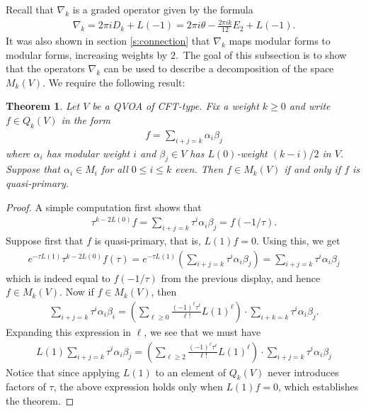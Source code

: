 \documentclass[12pt]{amsart}
\theoremstyle{plain}
\newtheorem{thm}{Theorem}[section]
\theoremstyle{definition}
\theoremstyle{remark}
\begin{document}
Recall that $\nabla_{k}$ is a graded operator given by the formula
\begin{align*}
    \nabla_{k} = 2\pi i D_{k} + L(-1) = 2\pi i \theta - \tfrac{2\pi i k}{12}E_{2} + L(-1).
\end{align*}
It was also shown in section \ref{s:connection} that $\nabla_{k}$ maps modular forms to modular forms, increasing weights by $2$.\ The goal of this subsection is to show that the operators $\nabla_k$ can be used to describe a decomposition of the space $M_{k}(V)$. We require the following result:
\begin{thm}
\label{t:quasiE2}
Let $V$ be a QVOA of CFT-type. Fix a weight $k \geq 0$ and write $f \in Q_{k}(V)$ in the form
\begin{align*}
            f = \sum_{i+j=k} \alpha_{i} \beta_{j}
        \end{align*}
        where $\alpha_{i}$ has modular weight $i$ and $\beta_{j} \in V$ has $L(0)$-weight $(k-i)/2$ in $V$.
    Suppose that $\alpha_{i} \in M_{i}$ for all $0 \leq i \leq k$ even. Then $f \in M_{k}(V)$ if and only if $f$ is quasi-primary.
    \end{thm}
\begin{proof}
        A simple computation first shows that
        \begin{align*}
            \tau^{k-2L(0)} f = \sum_{i+j=k} \tau^{i} \alpha_{i} \beta_{j} = f(-1/ \tau).
        \end{align*}
        Suppose first that $f$ is quasi-primary, that is, $L(1)f = 0$. Using this, we get
        \begin{align*}
            e^{-\tau L(1)} \tau^{k-2L(0)} f( \tau ) = e^{- \tau L(1)} \left( \sum_{i+j=k} \tau^{i} \alpha_{i} \beta_{j} \right) = \sum_{i+j=k} \tau^{i} \alpha_{i} \beta_{j}
        \end{align*}
        which is indeed equal to $f( -1/\tau )$ from the previous display, and hence $f \in M_{k}(V)$. Now if $f \in M_{k}(V)$, then
        \begin{align*}
            \sum_{i+j=k} \tau^{i} \alpha_{i} \beta_{i} = \left( \sum_{\ell \geq 0} \frac{(-1)^{\ell}\tau^{\ell}}{\ell!} L(1)^{\ell} \right) \cdot \sum_{i+k=k} \tau^{i} \alpha_{i} \beta_{j}.
        \end{align*}
        Expanding this expression in $\ell$, we see that we must have
        \begin{align*}
            L(1) \sum_{i+j=k} \tau^{i} \alpha_{i} \beta_{j} = \left( \sum_{\ell \geq 2} \frac{(-1)^{\ell}\tau^{\ell}}{\ell!} L(1)^{\ell} \right) \cdot \sum_{i+j=k} \tau^{i} \alpha_{i} \beta_{j}
        \end{align*}
        Notice that since applying $L(1)$ to an element of $Q_{k}(V)$ never introduces factors of $\tau$, the above expression holds only when $L(1)f = 0$, which establishes the theorem.
\end{proof}
\end{document}
